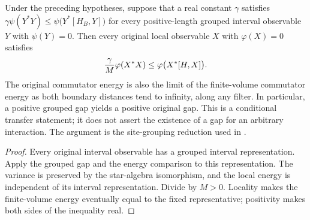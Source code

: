\begin{lemma}
    \label{thm:blocked_quasi_local_gap_transport}
    \leanok
    Under the preceding hypotheses, suppose that a real constant $\gamma$ satisfies
    $\gamma\psi(Y^*Y)\leq\psi\bigl(Y^*[H_B,Y]\bigr)$
    for every positive-length grouped interval observable $Y$ with $\psi(Y)=0$. Then every original
    local observable $X$ with $\varphi(X)=0$ satisfies
    \begin{align}
        \frac{\gamma}{M}\varphi(X^*X)
        \leq\varphi\bigl(X^*[H,X]\bigr).
        \notag
    \end{align}
    The original commutator energy is also the limit of the finite-volume
    commutator energy as both boundary distances tend to infinity, along any
    filter. In particular, a positive grouped gap yields a positive original gap.
    This is a conditional transfer statement; it does not assert the existence
    of a gap for an arbitrary interaction. The argument is the site-grouping
    reduction used in \cite[Section~6]{Nachtergaele1996Spectral}.
\end{lemma}
\begin{proof}\leanok
    Every original interval observable has a grouped interval representation.
    Apply the grouped gap and the energy comparison to this representation.
    The variance is preserved by the star-algebra isomorphism, and the local
    energy is independent of its interval representation. Divide by $M>0$.
    Locality makes the finite-volume energy eventually equal to the fixed
    representative; positivity makes both sides of the inequality real.
\end{proof}

